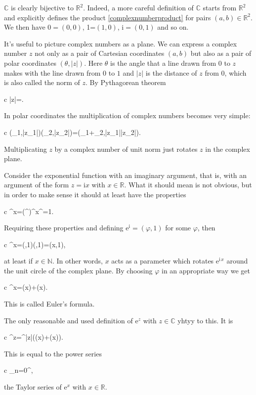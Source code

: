 \documentclass[11pt,%
]{memoir}
\newenvironment{eqna}{\begin{IEEEeqnarray}{c}}{\end{IEEEeqnarray}\ignorespacesafterend}
\newcommand{\NN}{\mathbb{N}}
\newcommand{\RR}{\mathbb{R}}
\newcommand{\CC}{\mathbb{C}}
\newcommand{\ee}{\mathrm{e}}
\newcommand{\ii}{\mathrm{i}}
\begin{document}
\(\CC\) is clearly bijective to \(\RR^2\). Indeed, a more careful definition of \(\CC\) starts from \(\RR^2\) and explicitly defines the product \eqref{complexnumberproduct} for pairs \((a,b)\in\RR^2\). We then have \(0=(0,0)\), 1=\((1,0)\), \(\ii=(0,1)\) and so on.

It's useful to picture complex numbers as a plane. We can express a complex number \(z\) not only as a pair of Cartesian coordinates \((a,b)\) but also as a pair of polar coordinates \((\theta,|z|)\). Here \(\theta\) is the angle that a line drawn from \(0\) to \(z\) makes with the line drawn from \(0\) to \(1\) and \(|z|\) is the distance of \(z\) from \(0\), which is also called the norm of \(z\). By Pythagorean theorem
\begin{eqna}
    |z|=.
\end{eqna}

In polar coordinates the multiplication of complex numbers becomes very simple:
\begin{eqna}
    (\theta_1,|z_1|)\cdot(\theta_2,|z_2|)=(\theta_1+\theta_2,|z_1||z_2|).
\end{eqna}
Multiplicating \(z\) by a complex number of unit norm just rotates \(z\) in the complex plane.

Consider the exponential function with an imaginary argument, that is, with an argument of the form \(z=\ii x\) with \(x\in\RR\). What it should mean is not obvious, but in order to make sense it should at least have the properties
\begin{eqna}
    \ee^{\ii x}=\left(\ee^\ii\right)^x\qquad{}\qquad\ee^{\ii{}}=1.
\end{eqna}
Requiring these properties and defining \(\ee^\ii=(\varphi,1)\) for some \(\varphi\), then
\begin{eqna}
    \ee^{\ii x}=(\varphi,1)(\varphi,1)\dotsb=(x\cdot\varphi,1),
\end{eqna}
at least if \(x\in\NN\). In other words, \(x\) acts as a parameter which rotates \(\ee^{\ii\,x}\) around the unit circle of the complex plane. By choosing \(\varphi\) in an appropriate way we get
\begin{eqna}
    \ee^{\ii x}=\cos(x)+\ii\sin(x).
\end{eqna}
This is called Euler's formula.

The only reasonable and used definition of \(\ee^{z}\) with \(z\in\CC\) yhtyy to this. It is
\begin{eqna}
    \ee^{z}=\ee^{|z|}(\cos(x)+\ii\sin(x)).
\end{eqna}
This is equal to the power series
\begin{eqna}
    \sum_{n=0}^\infty{},
\end{eqna}
the Taylor series of \(\ee^{x}\) with \(x\in\RR\).
\end{document}
